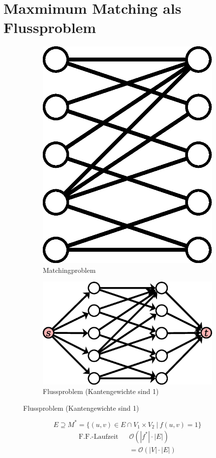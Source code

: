 \section{Maxmimum Matching als Flussproblem}
\begin{figure}[H]
	\begin{subfigure}[H]{0.4\linewidth}
\centering
\includegraphics[width=0.5\linewidth]{27/Grafik/Diagramm4}
\caption{Matchingproblem}
\label{fig:Diagramm4}
\end{subfigure}
\begin{subfigure}[H]{0.4\linewidth}
	\centering
	\includegraphics[width=\linewidth]{27/Grafik/Diagramm5}
	\caption{Flussproblem (Kantengewichte sind 1)}
	\label{fig:Diagramm5}
\end{subfigure}
\end{figure}
\[ E \supseteq M^* = \{ (u,v)\in E \cap V_1\times V_2 ~|~ f(u,v) = 1 \} \]
\begin{align*}
\text{F.F.-Laufzeit }~~ &\mathcal{O}(|f^*|\cdot|E|)\\
&=\mathcal{O}(|V|\cdot|E|)
\end{align*}


